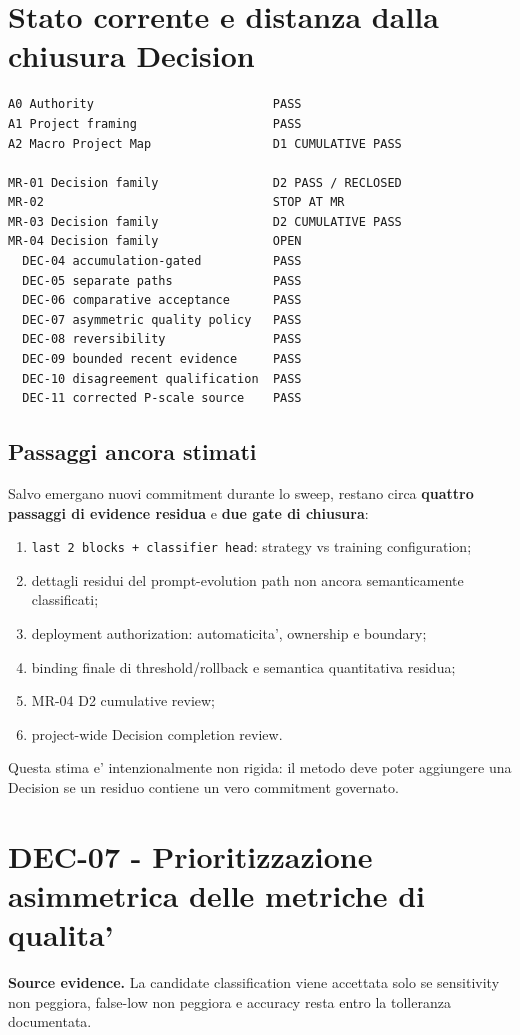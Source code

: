 \documentclass[11pt,a4paper]{article}
\begin{document}
\section{Stato corrente e distanza dalla chiusura Decision}
\begin{ddtacore}[title={Decision completion snapshot}]
\begin{lstlisting}
A0 Authority                         PASS
A1 Project framing                   PASS
A2 Macro Project Map                 D1 CUMULATIVE PASS

MR-01 Decision family                D2 PASS / RECLOSED
MR-02                                STOP AT MR
MR-03 Decision family                D2 CUMULATIVE PASS
MR-04 Decision family                OPEN
  DEC-04 accumulation-gated          PASS
  DEC-05 separate paths              PASS
  DEC-06 comparative acceptance      PASS
  DEC-07 asymmetric quality policy   PASS
  DEC-08 reversibility               PASS
  DEC-09 bounded recent evidence     PASS
  DEC-10 disagreement qualification  PASS
  DEC-11 corrected P-scale source    PASS
\end{lstlisting}
\end{ddtacore}

\subsection{Passaggi ancora stimati}
Salvo emergano nuovi commitment durante lo sweep, restano circa \textbf{quattro passaggi di evidence residua} e \textbf{due gate di chiusura}:
\begin{enumerate}
  \item \texttt{last 2 blocks + classifier head}: strategy vs training configuration;
  \item dettagli residui del prompt-evolution path non ancora semanticamente classificati;
  \item deployment authorization: automaticita', ownership e boundary;
  \item binding finale di threshold/rollback e semantica quantitativa residua;
  \item MR-04 D2 cumulative review;
  \item project-wide Decision completion review.
\end{enumerate}
Questa stima e' intenzionalmente non rigida: il metodo deve poter aggiungere una Decision se un residuo contiene un vero commitment governato.

\section{DEC-07 - Prioritizzazione asimmetrica delle metriche di qualita'}
\textbf{Source evidence.} La candidate classification viene accettata solo se sensitivity non peggiora, false-low non peggiora e accuracy resta entro la tolleranza documentata.
\end{document}
